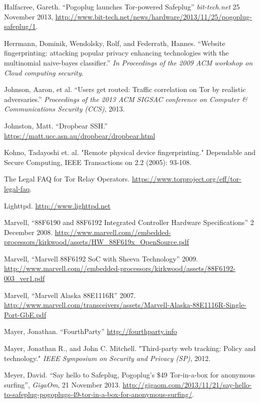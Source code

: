 \documentclass[conference]{IEEEtran}
\begin{document}
\begin{thebibliography}{1}
 Halfacree, Gareth. ``Pogoplug launches Tor-powered Safeplug'' \emph{bit-tech.net} 25 November 2013, \url{http://www.bit-tech.net/news/hardware/2013/11/25/pogoplug-safeplug/1}.

 Herrmann, Dominik, Wendolsky, Rolf, and Federrath, Hannes.  ``Website fingerprinting: attacking popular privacy enhancing technologies with the multinomial naive-bayes classifier.'' \emph{In Proceedings of the 2009 ACM workshop on Cloud computing security}.

 Johnson, Aaron, et al. ``Users get routed: Traffic correlation on Tor by realistic adversaries.'' \emph{Proceedings of the 2013 ACM SIGSAC conference on Computer \& Communications Security (CCS)}, 2013.

 Johnston, Matt. ``Dropbear SSH.'' \url{https://matt.ucc.asn.au/dropbear/dropbear.html}

 Kohno, Tadayoshi et. al. "Remote physical device fingerprinting." Dependable and Secure Computing, IEEE Transactions on 2.2 (2005): 93-108.

 The Legal FAQ for Tor Relay Operators. \url{https://www.torproject.org/eff/tor-legal-faq}.

 Lighttpd. \url{http://www.lighttpd.net}


 Marvell, ``88F6190 and 88F6192 Integrated Controller Hardware Specifications'' 2 December 2008. \url{http://www.marvell.com//embedded-processors/kirkwood/assets/HW_88F619x_OpenSource.pdf}

 Marvell, ``Marvell 88F6192 SoC with Sheeva Technology'' 2009. \url{http://www.marvell.com//embedded-processors/kirkwood/assets/88F6192-003_ver1.pdf}

 Marvell, ``Marvell Alaska 88E1116R'' 2007. \url{http://www.marvell.com/transceivers/assets/Marvell-Alaska-88E1116R-Single-Port-GbE.pdf}

 Mayer, Jonathan. ``FourthParty'' \url{http://fourthparty.info}

 Mayer, Jonathan R., and John C. Mitchell. "Third-party web tracking: Policy and technology." \emph{IEEE Symposium on Security and Privacy (SP)}, 2012.

 Meyer, David. ``Say hello to Safeplug, Pogoplug’s \$49 Tor-in-a-box for anonymous surfing'', \emph{GigaOm}, 21 November 2013. \url{http://gigaom.com/2013/11/21/say-hello-to-safeplug-pogoplugs-49-tor-in-a-box-for-anonymous-surfing/}.


\end{thebibliography}
\end{document}

